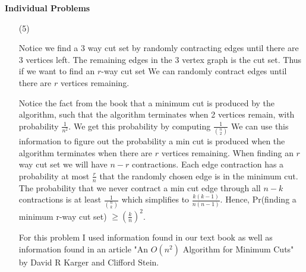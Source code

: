 \documentclass[11pt]{amsart}
\begin{document}
\noindent \textbf{Individual Problems}
\begin{enumerate}

\item[(5)]  

{
 Notice we find a 3 way cut set by randomly contracting edges until there are 3 vertices left.  The remaining edges in the 3 vertex graph is the cut set.  Thus if we want to find an $r$-way cut set We can randomly contract edges until there are $r$ vertices remaining.
 
 Notice the fact from the book that a minimum cut is produced by the algorithm, such that the algorithm terminates when 2 vertices remain, with probability $\frac{1}{n^2}$. We get this probability by computing $\frac{1}{{{n} \choose {2}}}$ We can use this information to figure out the probability a min cut is produced when the algorithm terminates when there are $r$ vertices remaining. When finding an $r$ way cut set we will have $n-r$ contractions.  Each edge contraction has a probability at most $\frac{r}{n}$ that the randomly chosen edge is in the minimum cut. The probability that we never contract a min cut edge through all $n-k$  contractions is at least $\frac{1}{{{n} \choose {k}}}$ which simplifies to $\frac{k(k-1)}{n(n-1)}$. Hence, Pr(finding a minimum r-way cut set) $\geq (\frac{k}{n})^2$.  
 
 For this problem I used information found in our text book as well as information found in an article  "An $O(n^2)$  Algorithm for Minimum Cuts" by David R  Karger and Clifford Stein.

}


\end{enumerate}
\end{document}
